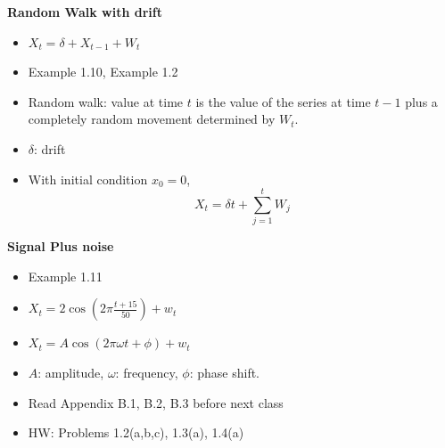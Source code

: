 \documentclass[12pt]{article} %
\newcommand{\Red}{\color{Red}}
\begin{document}
\noindent\textbf{Random Walk with drift}
\begin{itemize}
	\item $X_t = \delta + X_{t-1} + W_t$
	\item Example 1.10, Example 1.2
	\item Random walk: value at time $t$ is the value of the series at time $t-1$ plus a completely random movement determined by $W_t$. 
	\item $\delta$: drift
	\item With initial condition $x_0=0$, $$X_t=\delta t + \sum_{j=1}^{t} W_j$$
\end{itemize}

\noindent\textbf{Signal Plus noise}
\begin{itemize}
	\item Example 1.11
	\item $X_t = 2 \cos (2\pi \frac{t+15}{50}) + w_t$
	\item $X_t= A \cos (2\pi \omega t+\phi)+w_t$
	\item $A$: amplitude, $\omega$: frequency, $\phi$: phase shift. 
\end{itemize}


\hrulefill

{\Red
\begin{itemize}
	\item Read Appendix B.1, B.2, B.3 before next class
	\item HW: Problems 1.2(a,b,c), 1.3(a),  1.4(a) 
\end{itemize}
}
\end{document}
